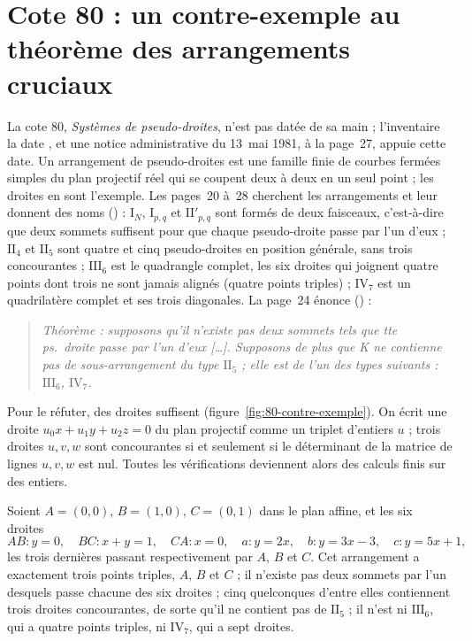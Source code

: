 \section[Cote 80 : un contre-exemple au théorème des arrangements cruciaux]{Cote 80 : un contre-exemple au théorème des arrangements cruciaux\protect{}}\label{sec:80}

La cote 80, \emph{Systèmes de pseudo-droites}, n'est pas datée de sa main ; l'inventaire la date , et une notice administrative du 13~mai 1981, à la page~27, appuie cette date. Un arrangement de pseudo-droites est une famille finie de courbes fermées simples du plan projectif réel qui se coupent deux à deux en un seul point ; les droites en sont l'exemple. Les pages~20 à~28 cherchent les arrangements  et leur donnent des noms () : $\mathrm{I}_N$, $\mathrm{I}_{p,q}$ et $\mathrm{II}'_{p,q}$ sont formés de deux faisceaux, c'est-à-dire que deux sommets suffisent pour que chaque pseudo-droite passe par l'un d'eux ; $\mathrm{II}_4$ et $\mathrm{II}_5$ sont quatre et cinq pseudo-droites en position générale, sans trois concourantes ; $\mathrm{III}_6$ est le quadrangle complet, les six droites qui joignent quatre points dont trois ne sont jamais alignés (quatre points triples) ; $\mathrm{IV}_7$ est un quadrilatère complet et ses trois diagonales. La page~24 énonce () :

\begin{quote}
\emph{Théorème : supposons qu'il n'existe pas deux sommets tels que tte ps.\ droite passe par l'un d'eux [\dots]. Supposons de plus que K ne contienne pas de sous-arrangement du type $\mathrm{II}_5$ ; elle est de l'un des types suivants : $\mathrm{III}_6$, $\mathrm{IV}_7$.}
\end{quote}

\noindent Pour le réfuter, des droites suffisent (figure~\ref{fig:80-contre-exemple}). On écrit une droite $u_0x + u_1y + u_2z = 0$ du plan projectif comme un triplet d'entiers $u$ ; trois droites $u, v, w$ sont concourantes si et seulement si le déterminant de la matrice de lignes $u, v, w$ est nul. Toutes les vérifications deviennent alors des calculs finis sur des entiers.

\begin{encadre}
\begin{contrexemple}
Soient $A = (0, 0)$, $B = (1, 0)$, $C = (0, 1)$ dans le plan affine, et les six droites
\[
AB : y = 0, \quad BC : x + y = 1, \quad CA : x = 0, \quad a : y = 2x, \quad b : y = 3x - 3, \quad c : y = 5x + 1,
\]
les trois dernières passant respectivement par $A$, $B$ et $C$. Cet arrangement a exactement trois points triples, $A$, $B$ et $C$ ; il n'existe pas deux sommets par l'un desquels passe chacune des six droites ; cinq quelconques d'entre elles contiennent trois droites concourantes, de sorte qu'il ne contient pas de $\mathrm{II}_5$ ; il n'est ni $\mathrm{III}_6$, qui a quatre points triples, ni $\mathrm{IV}_7$, qui a sept droites.
\end{contrexemple}
\end{encadre}

